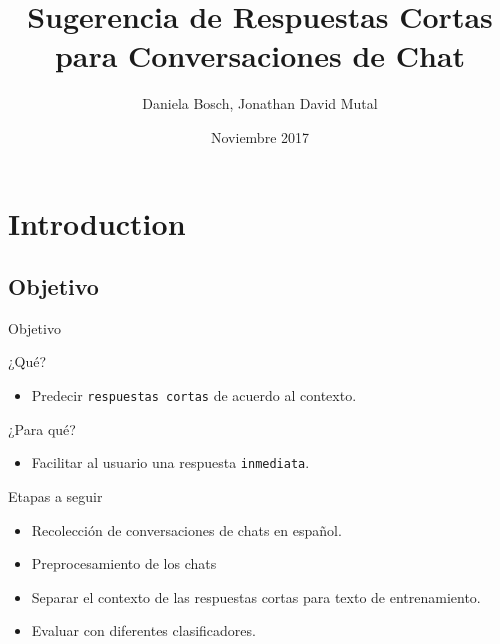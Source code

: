 \documentclass{beamer}
\title[Respuestas cortas]{Sugerencia de Respuestas Cortas para Conversaciones de Chat}
\author{Daniela Bosch, Jonathan David Mutal}
\date{Noviembre 2017}
\begin{document}
\begin{frame}
  \titlepage
\end{frame}


\section{Introduction}
\subsection{Objetivo}
\begin{frame}{Objetivo}
	\begin{block}{¿Qué?}
		\begin{itemize}
  			\item Predecir \texttt{respuestas cortas} de acuerdo al contexto.
		\end{itemize}
	\end{block}
	\begin{block}{¿Para qué?}
		\begin{itemize}
  			\item Facilitar al usuario una respuesta \texttt{inmediata}.
		\end{itemize}
	\end{block}
\end{frame}

\begin{frame}{Etapas a seguir}
	\begin{itemize}
		\item Recolección de conversaciones de chats en español.
        \item Preprocesamiento de los chats
        \item Separar el contexto de las respuestas cortas para texto de entrenamiento.
        \item Evaluar con diferentes clasificadores.
	\end{itemize}
\end{frame}
\end{document}
